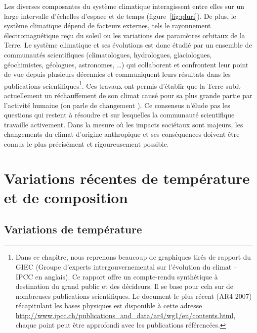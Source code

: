 \sk
Les diverses composantes du système climatique interagissent entre elles sur un large intervalle d'échelles d'espace et de temps (figure~\ref{fig:pluri}). De plus, le système climatique dépend de facteurs externes, tels le rayonnement électromagnétique reçu du soleil ou les variations des paramètres orbitaux de la Terre. Le système climatique et ses évolutions est donc étudié par un ensemble de communautés scientifiques (climatologues, hydrologues, glaciologues, géochimistes, géologues, astronomes, \ldots) qui collaborent et confrontent leur point de vue depuis plusieurs décennies et communiquent leurs résultats dans les publications scientifiques\footnote{Dans ce chapitre, nous reprenons beaucoup de graphiques tirés de rapport du GIEC (Groupe d'experts intergouvernemental sur l'évolution du climat -- IPCC en anglais). Ce rapport offre un compte-rendu synthétique à destination du grand public et des décideurs. Il se base pour cela sur de nombreuses publications scientifiques. Le document le plus récent (AR4 2007) récapitulant les bases physiques est disponible à cette adresse \url{http://www.ipcc.ch/publications_and_data/ar4/wg1/en/contents.html}, chaque point peut être approfondi avec les publications référencées.}. Ces travaux ont permis d'établir que la Terre subit actuellement un réchauffement de son climat causé pour sa plus grande partie par l'activité humaine (on parle de changement ). Ce consensus n'élude pas les questions qui restent à résoudre et sur lesquelles la communauté scientifique travaille activement. Dans la mesure où les impacts sociétaux sont majeurs, les changements du climat d'origine anthropique et ses conséquences doivent être connus le plus précisément et rigoureusement possible. 

\mk
\section{Variations récentes de température et de composition}

\sk
\subsection{Variations de température}



